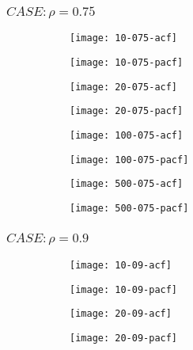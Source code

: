 \pagebreak

\subsubsection{$CASE: \rho = 0.75$}

\begin{figure}[htp]
	\centering
	\begin{subfigure}{0.23\textwidth}
		\centering
		\texttt{[image: 10-075-acf]}
	\end{subfigure}
	\begin{subfigure}{0.23\textwidth}
		\centering
		\texttt{[image: 10-075-pacf]}
	\end{subfigure}
	\begin{subfigure}{0.23\textwidth}
		\centering
		\texttt{[image: 20-075-acf]}
	\end{subfigure}
	\begin{subfigure}{0.23\textwidth}
		\centering
		\texttt{[image: 20-075-pacf]}
	\end{subfigure}
\end{figure}

\begin{figure}[htp]
	\centering
	\begin{subfigure}{0.23\textwidth}
		\centering
		\texttt{[image: 100-075-acf]}
	\end{subfigure}
	\begin{subfigure}{0.23\textwidth}
		\centering
		\texttt{[image: 100-075-pacf]}
	\end{subfigure}
	\begin{subfigure}{0.23\textwidth}
		\centering
		\texttt{[image: 500-075-acf]}
	\end{subfigure}
	\begin{subfigure}{0.23\textwidth}
		\centering
		\texttt{[image: 500-075-pacf]}
	\end{subfigure}
\end{figure}

\subsubsection{$CASE: \rho = 0.9$}

\begin{figure}[htp]
	\centering
	\begin{subfigure}{0.23\textwidth}
		\centering
		\texttt{[image: 10-09-acf]}
	\end{subfigure}
	\begin{subfigure}{0.23\textwidth}
		\centering
		\texttt{[image: 10-09-pacf]}
	\end{subfigure}
	\begin{subfigure}{0.23\textwidth}
		\centering
		\texttt{[image: 20-09-acf]}
	\end{subfigure}
	\begin{subfigure}{0.23\textwidth}
		\centering
		\texttt{[image: 20-09-pacf]}
	\end{subfigure}
\end{figure}

